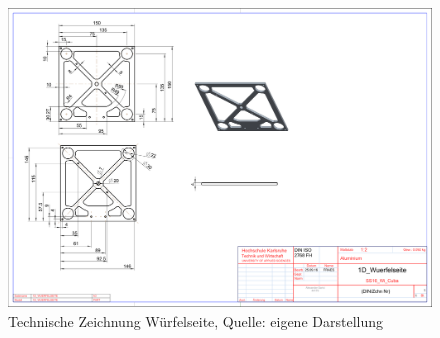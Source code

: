 \begin{landscape}
		
	\begin{figure} 
	\begin{center}
	\includegraphics[width=1.5\textwidth]{img/1d_wuerfelseite.pdf}
	\end{center}
	\caption{Technische Zeichnung Würfelseite, Quelle: eigene Darstellung}
	\end{figure}  
	
\end{landscape}